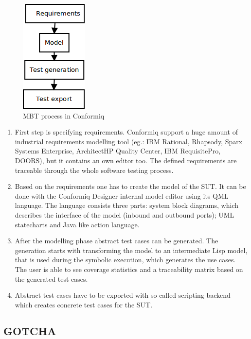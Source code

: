 \begin{figure}[htp]
\centering
\includegraphics[scale=0.6]{figures/conformiq_process.png}
\caption{MBT process in Conformiq}
\label{fig:conformiq_process}
\end{figure}

\begin{enumerate}
	\item First step is specifying requirements. Conformiq support a huge amount of industrial requirements modelling tool (eg.: IBM Rational, Rhapsody, Sparx Systems Enterprise, ArchitectHP Quality Center, IBM RequisitePro, DOORS), but it contains an own editor too. The defined requirements are traceable through the whole software testing process.
	\item Based on the requirements one has to create the model of the SUT. It can be done with the Conformiq Designer internal model editor using its QML language. The language consists three parts: system block diagrams, which describes the interface of the model (inbound and outbound ports); UML statecharts and Java like action language.
	\item After the modelling phase abstract test cases can be generated. The generation starts with transforming the model to an intermediate Lisp model, that is used during the symbolic execution, which generates the use cases. The user is able to see coverage statistics and a traceability matrix based on the generated test cases.
	\item Abstract test cases have to be exported with so called scripting backend which creates concrete test cases for the SUT.
\end{enumerate}


\subsection{GOTCHA}
\label{sub:gotcha}

